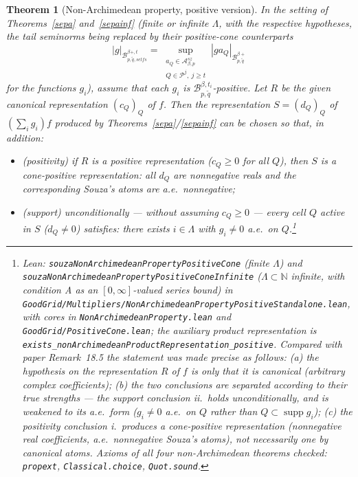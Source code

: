 \documentclass[11pt]{amsart}
\newtheorem{theorem}{Theorem}[section]
\theoremstyle{definition}
\newcommand{\lean}[1]{\texttt{#1}}
\begin{document}
\begin{theorem}[Non-Archimedean property, positive version]\label{posrem}
In the setting of Theorems~\ref{sepa} and~\ref{sepainf} (finite or infinite
$\Lambda$, with the respective hypotheses, the tail seminorms being replaced
by their positive-cone counterparts
$$|g|_{\mathcal{B}^{\beta+,t}_{p,\tilde q,selfs}}
=\sup_{\substack{ a_Q \in \mathcal{A}^{sz}_{\beta,p}\\ Q\in \mathcal{P}^j,\ j\geq t}} |ga_Q|_{\mathcal{B}^{\beta+}_{p,\tilde q}}$$
for the functions $g_i$), assume that each $g_i$ is
$\mathcal{B}^{\beta,t_i}_{p,\tilde q}$-positive. Let $R$ be the given
canonical representation $(c_Q)_Q$ of $f$. Then the representation
$S=(d_Q)_Q$ of $(\sum_i g_i)f$ produced by
Theorems~\ref{sepa}/\ref{sepainf} can be chosen so that, in addition:
\begin{itemize}
\item[i.] ({\it positivity}) if $R$ is a positive representation
($c_Q \geq 0$ for all $Q$), then $S$ is a cone-positive representation: all
$d_Q$ are nonnegative reals and the corresponding Souza's atoms are a.e.\
nonnegative;
\item[ii.] ({\it support}) unconditionally --- without assuming $c_Q\geq 0$
--- every cell $Q$ active in $S$ ($d_Q \neq 0$) satisfies: there exists
$i \in \Lambda$ with $g_i \neq 0$ a.e.\ on $Q$.\footnote{Lean: \lean{souzaNonArchimedeanPropertyPositiveCone} (finite
$\Lambda$) and \lean{souzaNonArchimedeanPropertyPositiveConeInfinite}
($\Lambda \subset \mathbb{N}$ infinite, with condition A as an
$[0,\infty]$-valued series bound) in
\lean{GoodGrid/Multipliers/NonArchimedeanPropertyPositiveStandalone.lean},
with cores in \lean{NonArchimedeanProperty.lean} and
\lean{GoodGrid/PositiveCone.lean}; the auxiliary product representation is
\lean{exists\_nonArchimedeanProductRepresentation\_positive}. Compared with
paper Remark~18.5 the statement was made precise as follows: (a) the
hypothesis on the representation $R$ of $f$ is only that it is canonical
(arbitrary complex coefficients); (b) the two conclusions are separated
according to their true strengths --- the support conclusion ii.\ holds
unconditionally, and is weakened to its a.e.\ form ($g_i \neq 0$ a.e.\ on
$Q$ rather than $Q \subset \operatorname{supp} g_i$); (c) the positivity
conclusion i.\ produces a \emph{cone-positive} representation (nonnegative
real coefficients, a.e.\ nonnegative Souza's atoms), not necessarily one by
canonical atoms. Axioms of all four non-Archimedean theorems checked:
\lean{propext}, \lean{Classical.choice}, \lean{Quot.sound}.}
\end{itemize}
\end{theorem}
\end{document}
